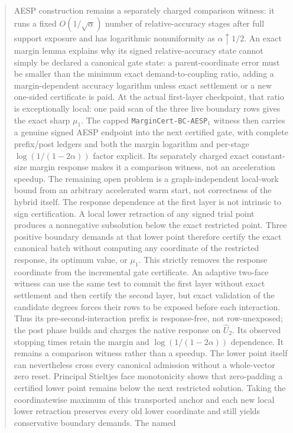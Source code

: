 \documentclass[11pt]{article}
\begin{document}
\begin{abstract}
AESP construction remains a separately charged comparison witness: it runs a
fixed $O(1/\sqrt\alpha)$ number of relative-accuracy stages after full support
exposure and has logarithmic nonuniformity as $\alpha\uparrow1/2$.  An exact
margin lemma explains why its signed relative-accuracy state cannot simply be
declared a canonical gate state: a parent-coordinate error must be smaller
than the minimum exact demand-to-coupling ratio, adding a margin-dependent
accuracy logarithm unless exact settlement or a new one-sided certificate is
paid.  At the actual first-layer checkpoint, that ratio is exceptionally
local: one paid scan of the three live boundary rows gives the exact sharp
$\mu_1$.  The capped \texttt{MarginCert-BC-AESP}$_1$ witness then carries a
genuine signed AESP endpoint into the next certified gate, with complete
prefix/post ledgers and both the margin logarithm and per-stage
$\log(1/(1-2\alpha))$ factor explicit.  Its separately charged exact
constant-size margin response makes it a comparison witness, not an
acceleration speedup.  The remaining open problem is a
graph-independent local-work bound
from an arbitrary accelerated warm start, not correctness of the hybrid
itself.
The response dependence at the first layer is not intrinsic to sign
certification.  A local lower retraction of any signed trial point produces a
nonnegative subsolution below the exact restricted point.  Three positive
boundary demands at that lower point therefore certify the exact canonical
batch without computing any coordinate of the restricted response, its
optimum value, or $\mu_1$.  This strictly removes the response coordinate from
the incremental gate certificate.  An adaptive two-face witness can use the
same test to commit the first layer without exact settlement and then certify
the second layer, but exact validation of the candidate degrees forces their
rows to be exposed before each interaction.  Thus its
pre-second-interaction prefix is response-free, not row-unexposed; the post
phase builds and charges the native response on $\widehat U_2$.  Its observed
stopping times retain the margin and $\log(1/(1-2\alpha))$ dependence.  It
remains a comparison witness rather than a speedup.
The lower point itself can nevertheless cross every canonical admission
without a whole-vector zero reset.  Principal Stieltjes face monotonicity
shows that zero-padding a certified lower point remains below the next
restricted solution.  Taking the coordinatewise maximum of this transported
anchor and each new local lower retraction preserves every old lower
coordinate and still yields conservative boundary demands.  The named

\end{abstract}
\end{document}

